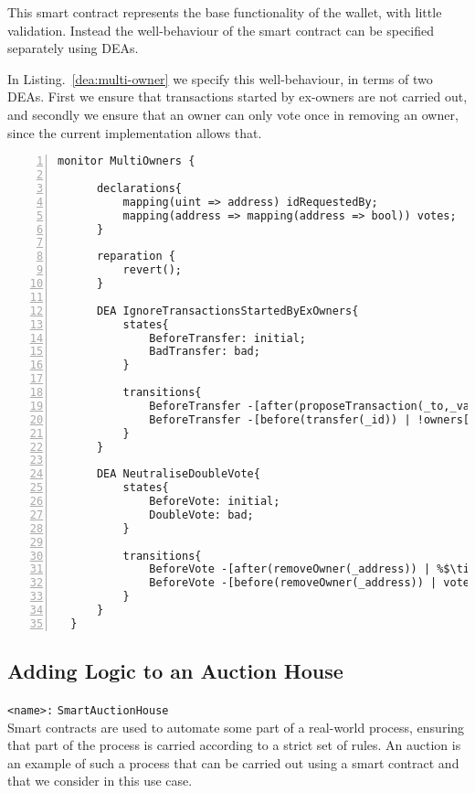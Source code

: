 \documentclass{article}
\newcommand{\tildearrow}{{\raise.37ex\hbox{$\scriptstyle\mathtt{\sim}$}}\hspace{-0.08cm}>\xspace}
\begin{document}
This smart contract represents the base functionality of the wallet, with little validation. Instead the well-behaviour of the smart contract can be specified separately using DEAs. 

In Listing.~\ref{dea:multi-owner} we specify this well-behaviour, in terms of two DEAs. First we ensure that transactions started by ex-owners are not carried out, and secondly we ensure that an owner can only vote once in removing an owner, since the current implementation allows that.

  \small\begin{lstlisting}[language=DEA,basicstyle=\scriptsize,numbers=left,numbersep=2pt,xleftmargin=0.3cm,escapechar=\%,label={dea:multi-owner}]
  monitor MultiOwners {
  
      declarations{
          mapping(uint => address) idRequestedBy;
          mapping(address => mapping(address => bool)) votes;
      }
  
      reparation {
          revert();
      }
  
      DEA IgnoreTransactionsStartedByExOwners{
          states{
              BeforeTransfer: initial;
              BadTransfer: bad;
          }
  
          transitions{
              BeforeTransfer -[after(proposeTransaction(_to,_val)) | %$\tildearrow$% idRequestedBy[--id] = msg.sender;]-> BeforeTransfer;
              BeforeTransfer -[before(transfer(_id)) | !owners[idRequestedBy[id]]]-> BadTransfer;
          }
      }
  
      DEA NeutraliseDoubleVote{
          states{
              BeforeVote: initial;
              DoubleVote: bad;
          }
  
          transitions{
              BeforeVote -[after(removeOwner(_address)) | %$\tildearrow$% votes[_address][msg.sender] = true;]-> BeforeVote;
              BeforeVote -[before(removeOwner(_address)) | votes[_address][msg.sender]]-> DoubleVote;
          }
      }
  }
 \end{lstlisting}\normalsize


\subsection{Adding Logic to an Auction House}
         \texttt{<name>:} \verb+SmartAuctionHouse+\\
 
 Smart contracts are used to automate some part of a real-world process, ensuring that part of the process is carried according to a strict set of rules. An auction is an example of such a process that can be carried out using a smart contract and that we consider in this use case.
 
\end{document}
